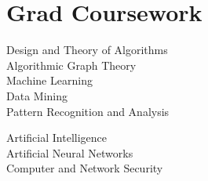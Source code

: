 \documentclass[]{deedy-resume-openfont-rileyannis}
\begin{document}
\begin{minipage}[t]{0.33\textwidth}
\section{Grad Coursework}
Design and Theory of Algorithms\\
Algorithmic Graph Theory\\
Machine Learning\\
Data Mining\\
Pattern Recognition and Analysis\\
\sectionsep


Artificial Intelligence\\
Artificial Neural Networks\\
Computer and Network Security\\
\sectionsep




\end{minipage}
\end{document}
